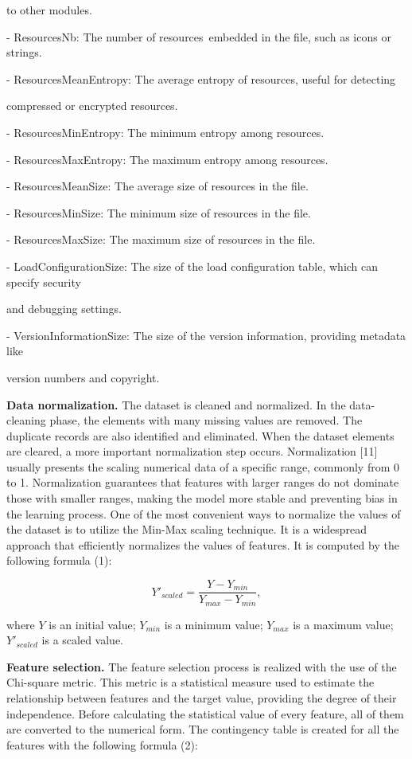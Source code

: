 \begin{multicols}{2}
to other modules.

- ResourcesNb: The number of resources~embedded in the file, such as
icons or strings.

- ResourcesMeanEntropy: The average entropy of resources, useful for
detecting

compressed or encrypted resources.

- ResourcesMinEntropy: The minimum entropy among resources.

- ResourcesMaxEntropy: The maximum entropy among resources.

- ResourcesMeanSize: The average size of resources in the file.

- ResourcesMinSize: The minimum size of resources in the file.

- ResourcesMaxSize: The maximum size of resources in the file.

- LoadConfigurationSize: The size of the load configuration table, which
can specify security

and debugging settings.

- VersionInformationSize: The size of the version information, providing
metadata like

version numbers and copyright.

{\bfseries Data normalization.} The dataset is cleaned and normalized. In
the data-cleaning phase, the elements with many missing values are
removed. The duplicate records are also identified and eliminated. When
the dataset elements are cleared, a more important normalization step
occurs. Normalization {[}11{]} usually presents the scaling numerical
data of a specific range, commonly from 0 to 1. Normalization guarantees
that features with larger ranges do not dominate those with smaller
ranges, making the model more stable and preventing bias in the learning
process. One of the most convenient ways to normalize the values of the
dataset is to utilize the Min-Max scaling technique. It is a widespread
approach that efficiently normalizes the values of features. It is
computed by the following formula (1):

\begin{equation}
Y'_{scaled}=\frac{Y-Y_{min}}{Y_{max}-Y_{min}},
\end{equation}

where $Y$ is an initial value; $Y_{min}$ is a minimum value; $Y_{max}$ is a maximum value; $Y'_{scaled}$ is a scaled value.

{\bfseries Feature selection.} The feature selection process is realized
with the use of the Chi-square metric. This metric is a statistical
measure used to estimate the relationship between features and the
target value, providing the degree of their independence. Before
calculating the statistical value of every feature, all of them are
converted to the numerical form. The contingency table is created for
all the features with the following formula (2):


\end{multicols}
